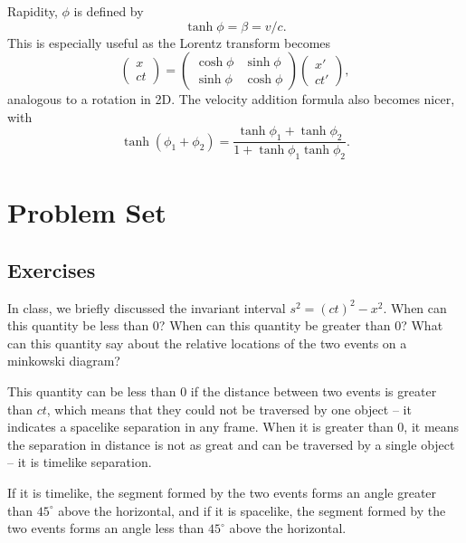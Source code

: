 \documentclass[11pt]{scrartcl}
\begin{document}
\begin{idea}[Rapidity]
    Rapidity, $\phi$ is defined by
    $$\tanh \phi = \beta = v/c.$$
    This is especially useful as the Lorentz transform becomes
    $$\begin{pmatrix}
 x \\ ct
\end{pmatrix} = \begin{pmatrix}\cosh \phi & \sinh \phi \\ \sinh \phi & \cosh \phi\end{pmatrix}\begin{pmatrix}x' \\ ct'\end{pmatrix},$$
analogous to a rotation in 2D. The velocity addition formula also becomes nicer, with
$$\tanh(\phi_1+\phi_2) = \frac{\tanh \phi_1 + \tanh \phi_2}{1+\tanh\phi_1 \tanh \phi_2}.$$
\end{idea}

\section{Problem Set}

\subsection{Exercises}

\begin{prob}
    In class, we briefly discussed the invariant interval $s^2 = (ct)^2 - x^2$. When can this quantity be less than $0$? When can this quantity be greater than $0$? What can this quantity say about the relative locations of the two events on a minkowski diagram?
\end{prob}
\begin{sol}
    This quantity can be less than 0 if the distance between two events is greater than $ct$, which means that they could not be traversed by one object -- it indicates a spacelike separation in any frame. When it is greater than $0$, it means the separation in distance is not as great and can be traversed by a single object -- it is timelike separation.

    If it is timelike, the segment formed by the two events forms an angle greater than $45^\circ$ above the horizontal, and if it is spacelike, the segment formed by the two events forms an angle less than $45^\circ$ above the horizontal.
\end{sol}
\end{document}
